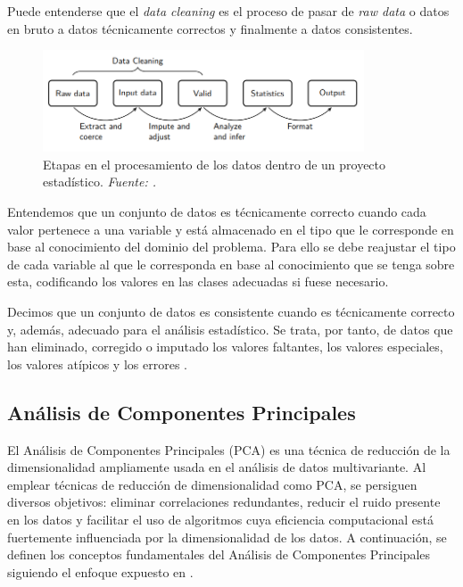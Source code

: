 \documentclass[12pt,a4paper,]{book}
\numberwithin{dummy}{section}
\theoremstyle{ocrenumbox}
\theoremstyle{blacknumex}
\theoremstyle{blacknumbox}
\theoremstyle{ocrenum}
\theoremstyle{ocrenum}
\begin{document}
Puede entenderse que el \emph{data cleaning} es el proceso de pasar de
\emph{raw data} o datos en bruto a datos técnicamente correctos y
finalmente a datos consistentes.

\begin{figure}[H]
\centering
\includegraphics[width = 0.85\textwidth]{graficos/statistical_value_chain.png}
\caption[Etapas en el procesamiento de los datos dentro de un proyecto estadístico]{Etapas en el procesamiento de los datos dentro de un proyecto estadístico. \it Fuente: \citet{van2018statistical}.}
\label{fig:stat_val}
\end{figure}

Entendemos que un conjunto de datos es técnicamente correcto cuando cada
valor pertenece a una variable y está almacenado en el tipo que le
corresponde en base al conocimiento del dominio del problema. Para ello
se debe reajustar el tipo de cada variable al que le corresponda en base
al conocimiento que se tenga sobre esta, codificando los valores en las
clases adecuadas si fuese necesario.

Decimos que un conjunto de datos es consistente cuando es técnicamente
correcto y, además, adecuado para el análisis estadístico. Se trata, por
tanto, de datos que han eliminado, corregido o imputado los valores
faltantes, los valores especiales, los valores atípicos y los errores
\citep{de2013introduction}.

\hypertarget{anuxe1lisis-de-componentes-principales}{%
\subsection{Análisis de Componentes
Principales}\label{anuxe1lisis-de-componentes-principales}}

El Análisis de Componentes Principales (PCA) es una técnica de reducción
de la dimensionalidad ampliamente usada en el análisis de datos
multivariante. Al emplear técnicas de reducción de dimensionalidad como
PCA, se persiguen diversos objetivos: eliminar correlaciones
redundantes, reducir el ruido presente en los datos y facilitar el uso
de algoritmos cuya eficiencia computacional está fuertemente
influenciada por la dimensionalidad de los datos. A continuación, se
definen los conceptos fundamentales del Análisis de Componentes
Principales siguiendo el enfoque expuesto en \citep{PCAShaoDeng}.
\end{document}
